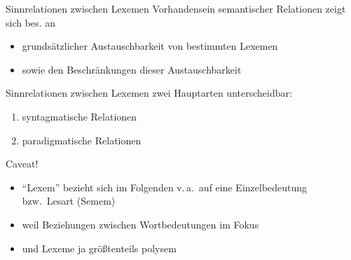 \begin{frame}{Sinnrelationen zwischen Lexemen}
\onslide<+->
Vorhandensein semantischer Relationen zeigt sich bes. an
\begin{itemize}[<+->]
	\item	grundsätzlicher Austauschbarkeit von bestimmten Lexemen
	\item	sowie den Beschränkungen dieser Austauschbarkeit
\end{itemize}
\onslide<+->
\Zeile
\begin{exe}
	\onslide<+->
	\onslide<+->
\end{exe}
\end{frame}

\begin{frame}{Sinnrelationen zwischen Lexemen}
\onslide<+->
zwei Hauptarten unterscheidbar:
\Halbzeile
\begin{enumerate}[<+->]
	\item		syntagmatische Relationen
	\item		paradigmatische Relationen
\end{enumerate}
\onslide<+->
\Zeile
\begin{block}{Caveat!}
\begin{itemize}[<+->]
	\item		"`Lexem"' bezieht sich im Folgenden v.\,a.\ auf eine Einzelbedeutung\\
          bzw.\ Lesart (Semem)
	\item		weil Beziehungen zwischen Wortbedeutungen im Fokus
	\item		und Lexeme ja größtenteils polysem
\end{itemize}
\end{block}
\end{frame}


